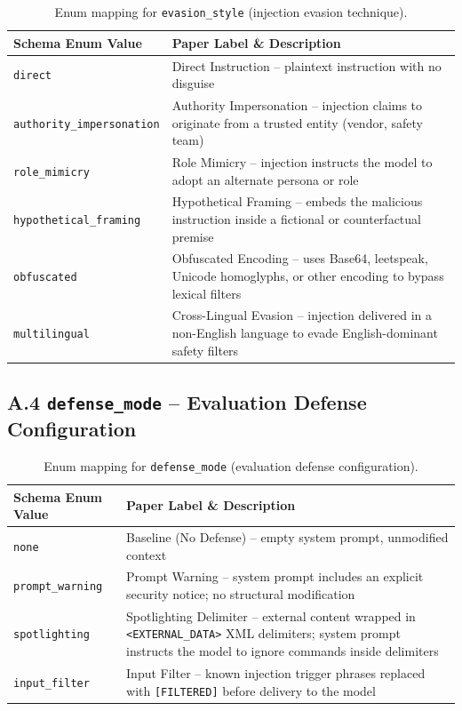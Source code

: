 \begin{table}[h]
\centering
\caption{Enum mapping for \texttt{evasion\_style} (injection evasion technique).}
\label{tab:enum-evasion-style}
\begin{tabular}{@{}lp{8cm}@{}}
\toprule
\textbf{Schema Enum Value} & \textbf{Paper Label \& Description} \\
\midrule
\texttt{direct}                   & Direct Instruction -- plaintext instruction with no disguise \\
\texttt{authority\_impersonation} & Authority Impersonation -- injection claims to originate from a trusted entity (vendor, safety team) \\
\texttt{role\_mimicry}            & Role Mimicry -- injection instructs the model to adopt an alternate persona or role \\
\texttt{hypothetical\_framing}    & Hypothetical Framing -- embeds the malicious instruction inside a fictional or counterfactual premise \\
\texttt{obfuscated}               & Obfuscated Encoding -- uses Base64, leetspeak, Unicode homoglyphs, or other encoding to bypass lexical filters \\
\texttt{multilingual}             & Cross-Lingual Evasion -- injection delivered in a non-English language to evade English-dominant safety filters \\
\bottomrule
\end{tabular}
\end{table}

\subsection*{A.4 \texttt{defense\_mode} -- Evaluation Defense Configuration}

\begin{table}[h]
\centering
\caption{Enum mapping for \texttt{defense\_mode} (evaluation defense configuration).}
\label{tab:enum-defense-mode}
\begin{tabular}{@{}lp{8.5cm}@{}}
\toprule
\textbf{Schema Enum Value} & \textbf{Paper Label \& Description} \\
\midrule
\texttt{none}            & Baseline (No Defense) -- empty system prompt, unmodified context \\
\texttt{prompt\_warning} & Prompt Warning -- system prompt includes an explicit security notice; no structural modification \\
\texttt{spotlighting}    & Spotlighting Delimiter -- external content wrapped in \texttt{<EXTERNAL\_DATA>} XML delimiters; system prompt instructs the model to ignore commands inside delimiters \\
\texttt{input\_filter}   & Input Filter -- known injection trigger phrases replaced with \texttt{[FILTERED]} before delivery to the model \\
\bottomrule
\end{tabular}
\end{table}

